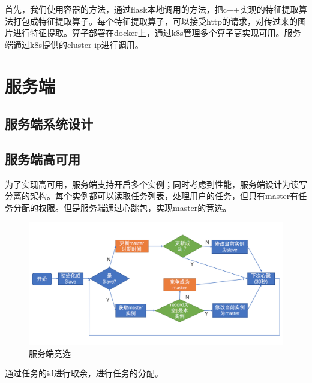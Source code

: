 首先，我们使用容器的方法，通过flask本地调用的方法，把c++实现的特征提取算法打包成特征提取算子。每个特征提取算子，可以接受http的请求，对传过来的图片进行特征提取。算子部署在docker上，通过k8s管理多个算子高实现可用。服务端通过k8s提供的cluster ip进行调用。


\section{服务端}
\subsection{服务端系统设计}



\subsection{服务端高可用}
为了实现高可用，服务端支持开启多个实例；同时考虑到性能，服务端设计为读写分离的架构。每个实例都可以读取任务列表，处理用户的任务，但只有master有任务分配的权限。但是服务端通过心跳包，实现master的竞选。
\begin{figure}
    \centering
    \includegraphics[width=12cm]{images/slave-master.png}
    \caption{服务端竞选}
    \label{fig:my_label}
\end{figure}
通过任务的id进行取余，进行任务的分配。


